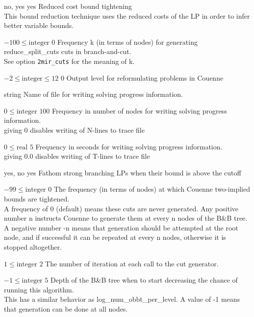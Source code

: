 %
{\ttfamily no, yes}%
{yes}%
{Reduced cost bound tightening\\
This bound reduction technique uses the reduced costs of the LP in order to infer better variable bounds.}%
{}

%
{$-100\leq\textrm{integer}$}%
{$0$}%
{Frequency k (in terms of nodes) for generating reduce\_split\_cuts cuts in branch-and-cut.\\
See option \texttt{2mir\_cuts} for the meaning of k.}%
{}

%
{$-2\leq\textrm{integer}\leq12$}%
{$0$}%
{Output level for reformulating problems in Couenne}%
{}

%
{string}%
{}%
{Name of file for writing solving progress information.}%
{}

%
{$0\leq\textrm{integer}$}%
{$100$}%
{Frequency in number of nodes for writing solving progress information.\\
giving 0 disables writing of N-lines to trace file}%
{}

%
{$0\leq\textrm{real}$}%
{$5$}%
{Frequency in seconds for writing solving progress information.\\
giving 0.0 disables writing of T-lines to trace file}%
{}

%
{\ttfamily yes, no}%
{yes}%
{Fathom strong branching LPs when their bound is above the cutoff}%
{}

%
{$-99\leq\textrm{integer}$}%
{$0$}%
{The frequency (in terms of nodes) at which Couenne two-implied bounds are tightened.\\
A frequency of 0 (default) means these cuts are never generated. Any positive number n instructs Couenne to generate them at every n nodes of the B\&B tree. A negative number -n means that generation should be attempted at the root node, and if successful it can be repeated at every n nodes, otherwise it is stopped altogether.}%
{}

%
{$1\leq\textrm{integer}$}%
{$2$}%
{The number of iteration at each call to the cut generator.}%
{}

%
{$-1\leq\textrm{integer}$}%
{$5$}%
{Depth of the B\&B tree when to start decreasing the chance of running this algorithm.\\
This has a similar behavior as log\_num\_obbt\_per\_level. A value of -1 means that generation can be done at all nodes.}%
{}

